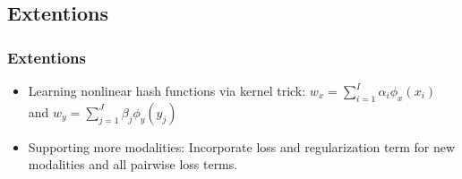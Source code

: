 \documentclass{beamer}
\begin{document}
\begin{CJK*}{UTF8}{gbsn}
\subsection{Extentions}
\begin{frame}\frametitle{Extentions}
\begin{itemize}
\item Learning nonlinear hash functions via kernel trick:
$w_x=\sum_{i=1}^I\alpha_i\phi_x(x_i)$ and $w_y=\sum_{j=1}^J\beta_j\phi_y(y_j)$
\item Supporting more modalities:
Incorporate loss and regularization term for new modalities and all pairwise loss terms.
\end{itemize}
\end{frame}


\end{CJK*}
\end{document}
